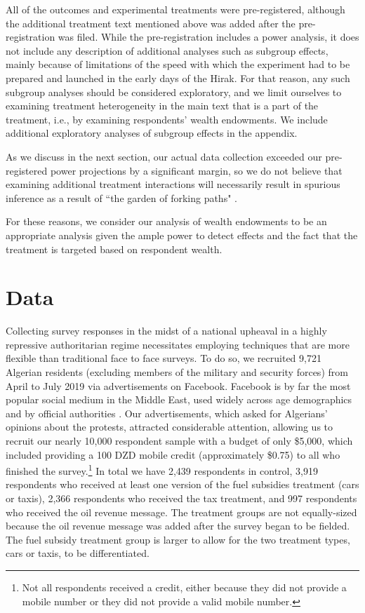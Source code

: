 \documentclass[12pt, letterpaper]{article}
\begin{document}
All of the outcomes and experimental treatments were pre-registered, although the additional treatment text mentioned above was added after the pre-registration was filed. While the pre-registration includes a power analysis, it does not include any description of additional analyses such as subgroup effects, mainly because of limitations of the speed with which the experiment had to be prepared and launched in the early days of the Hirak. For that reason, any such subgroup analyses should be considered exploratory, and we limit ourselves to examining treatment heterogeneity in the main text that is a part of the treatment, i.e., by examining respondents' wealth endowments. We include additional exploratory analyses of subgroup effects in the appendix. 

As we discuss in the next section, our actual data collection exceeded our pre-registered power projections by a significant margin, so we do not believe that examining additional treatment interactions will necessarily result in spurious inference as a result of ``the garden of forking paths" \parencite{gelman_garden_2013}. 

For these reasons, we consider our analysis of wealth endowments to be an appropriate analysis given the ample power to detect effects and the fact that the treatment is targeted based on respondent wealth.

\section*{Data}

Collecting survey responses in the midst of a national upheaval in a highly repressive authoritarian regime necessitates employing techniques that are more flexible than traditional face to face surveys. To do so, we recruited 9,721 Algerian residents (excluding members of the military and security forces) from April to July 2019 via advertisements on Facebook. Facebook is by far the most popular social medium in the Middle East, used widely across age demographics and by official authorities \parencite{dennis_media_2016}. Our advertisements, which asked for Algerians' opinions about the protests, attracted considerable attention, allowing us to recruit our nearly 10,000 respondent sample with a budget of only \$5,000, which included providing a 100 DZD mobile credit (approximately \$0.75) to all who finished the survey.\footnote{Not all respondents received a credit, either because they did not provide a mobile number or they did not provide a valid mobile number.} In total we have 2,439 respondents in control, 3,919 respondents who received at least one version of the fuel subsidies treatment (cars or taxis), 2,366 respondents who received the tax treatment, and 997 respondents who received the oil revenue message. The treatment groups are not equally-sized because the oil revenue message was added after the survey began to be fielded. The fuel subsidy treatment group is larger to allow for the two treatment types, cars or taxis, to be differentiated. 
\end{document}
